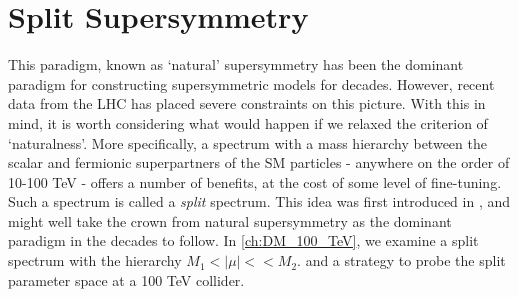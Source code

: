 \section{Split Supersymmetry}
This paradigm, known as `natural' supersymmetry  has been the dominant paradigm for constructing supersymmetric models for decades. However, recent data from the LHC has placed severe constraints on this picture. With this in mind, it is worth considering what would happen if we relaxed the criterion of `naturalness'. More specifically, a spectrum with a mass hierarchy between the scalar and fermionic superpartners of the SM particles - anywhere on the order of 10-100 TeV - offers a number of benefits, at the cost of some level of fine-tuning. Such a spectrum is called a \emph{split} spectrum. This idea was first introduced in \citep{Wells:2003tf,ArkaniHamed:2004fb,Giudice2005}, and might well take the crown from natural supersymmetry as the dominant paradigm in the decades to follow. In \autoref{ch:DM_100_TeV}, we examine a split spectrum with the hierarchy $M_1 < |\mu| << M_2$. and a strategy to probe the split parameter space at a 100 TeV collider.
